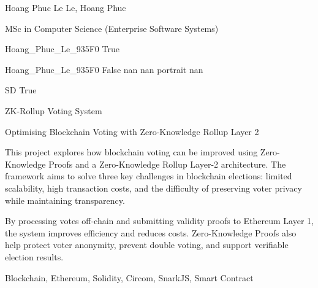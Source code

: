 \documentclass[twoside]{report}
\begin{document}
\begingroup{}\relax



\def\Key{Hoang_Phuc_Le_935F0}

{Hoang Phuc Le}
{Le, Hoang Phuc}

{MSc in Computer Science (Enterprise Software Systems)}

{Hoang_Phuc_Le_935F0}
{True}

{Hoang_Phuc_Le_935F0}
{False}
{nan}
{nan}
{portrait}
{nan}

{SD}
{True}

{ZK-Rollup Voting System}

{Optimising Blockchain Voting with Zero-Knowledge Rollup Layer 2}

{This project explores how blockchain voting can be improved using Zero-Knowledge Proofs and a Zero-Knowledge Rollup Layer-2 architecture. The framework aims to solve three key challenges in blockchain elections: limited scalability, high transaction costs, and the difficulty of preserving voter privacy while maintaining transparency.

By processing votes off-chain and submitting validity proofs to Ethereum Layer 1, the system improves efficiency and reduces costs. Zero-Knowledge Proofs also help protect voter anonymity, prevent double voting, and support verifiable election results.}

{Blockchain, Ethereum, Solidity, Circom, SnarkJS, Smart Contract}
\end{document}
